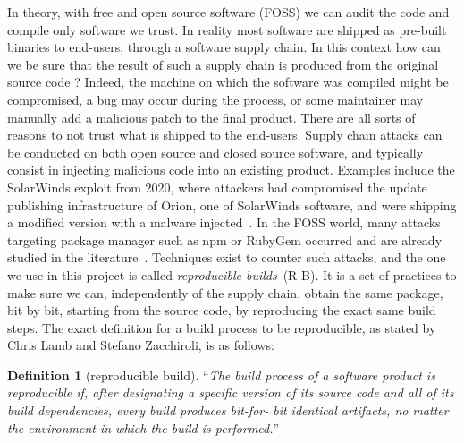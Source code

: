 \documentclass[a4paper,11pt,oneside]{report}
\theoremstyle{definition}
\newtheorem{definition}{Definition}[section]
\newcommand{\rb}{reproducible builds\xspace}
\begin{document}
In theory, with free and open source software (FOSS) we can audit the code and
compile only software we trust. In reality most software are shipped as
pre-built binaries to end-users, through a software supply chain. In this
context how can we be sure that the result of such a supply chain is produced
from the original source code ? Indeed, the machine on which the software was
compiled might be compromised, a bug may occur during the process, or some
maintainer may manually add a malicious patch to the final
product. There are all sorts of reasons to not trust what is shipped to the
end-users. Supply chain attacks can be conducted on both open source and closed
source software, and typically consist in injecting malicious code into an
existing product. Examples include the SolarWinds exploit from 2020, where
attackers had compromised the update publishing infrastructure of Orion, one of
SolarWinds software, and were shipping a modified version with a malware
injected~\cite{enwiki:solarwinds}. In the FOSS world, many attacks targeting
package manager such as npm or RubyGem occurred and are already studied in the
literature~\cite{10.1007/978-3-030-52683-2_2}.
Techniques exist to counter such attacks, and the one we use in this project is
called \emph{\rb}~(R-B). It is a set of practices to make sure we can, independently of
the supply chain, obtain the same package, bit by bit, starting from the source
code, by reproducing the exact same build steps. The exact definition for a
build process to be reproducible, as stated by Chris Lamb and Stefano Zacchiroli, is
as follows:

\begin{definition}[reproducible build]
\label{def:reprobuild}
``\emph{The build process of a software
product is reproducible if, after designating a
specific version of its source code and all of its
build dependencies, every build produces bit-for-
bit identical artifacts, no matter the environment
in which the build is performed.}''~\cite{DBLP:journals/corr/abs-2104-06020}
\end{definition}
\end{document}
